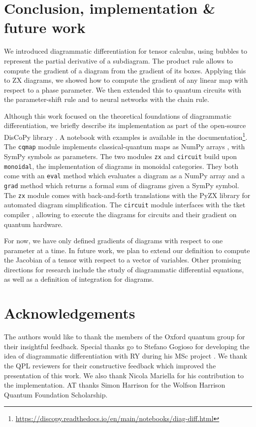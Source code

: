 
\section*{Conclusion, implementation \& future work}

We introduced diagrammatic differentiation for tensor calculus, using bubbles
to represent the partial derivative of a subdiagram. The product rule
allows to compute the gradient of a diagram from the gradient of its boxes.
Applying this to ZX diagrams, we showed how to compute the gradient of any linear
map with respect to a phase parameter. We then extended this to quantum circuits
with the parameter-shift rule and to neural networks with the chain rule.

Although this work focused on the theoretical foundations of diagrammatic
differentiation, we briefly describe its implementation as
part of the open-source DisCoPy library \cite{DeFeliceEtAl20}. A notebook
with examples is available in the documentation\footnote{
\href{https://discopy.readthedocs.io/en/main/notebooks/diag-diff.html}{
https://discopy.readthedocs.io/en/main/notebooks/diag-diff.html}}.
The \texttt{cqmap} module implements classical-quantum maps as NumPy arrays
\cite{VanDerWaltEtAl11}, with SymPy \cite{MeurerEtAl17} symbols as parameters.
The two modules \texttt{zx} and \texttt{circuit} build upon \texttt{monoidal},
the implementation of diagrams in monoidal categories. They both come with
an \texttt{eval} method which evaluates a diagram as a NumPy array and a
\texttt{grad} method which returns a formal sum of diagrams given a SymPy symbol.
The \texttt{zx} module comes with back-and-forth translations with the PyZX
library \cite{KissingerVanDeWetering19} for automated diagram simplification.
The \texttt{circuit} module interfaces with the tket compiler \cite{SivarajahEtAl20},
allowing to execute the diagrams for circuits and their gradient on quantum hardware.

For now, we have only defined gradients of diagrams with respect to one
parameter at a time. In future work, we plan to extend our definition to
compute the Jacobian of a tensor with respect to a vector of variables.
Other promising directions for research include the study of diagrammatic
differential equations, as well as a definition of integration for diagrams.

\section*{Acknowledgements}

The authors would like to thank the members of the Oxford quantum group for
their insightful feedback.
Special thanks go to Stefano Gogioso for developing the idea of
diagrammatic differentiation with RY during his MSc project \cite{Yeung20}.
We thank the QPL reviewers for their constructive feedback which improved the
presentation of this work.
We also thank Nicola Mariella for his contribution
to the implementation. AT thanks Simon Harrison for the Wolfson Harrison Quantum
Foundation Scholarship.
